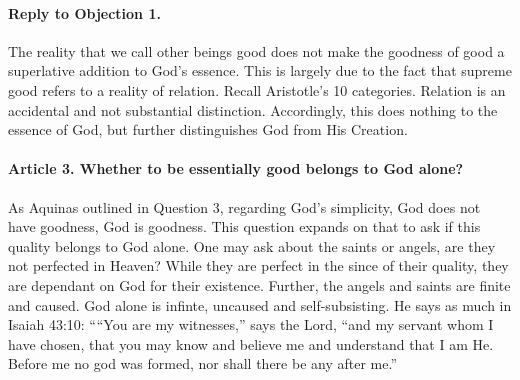 \documentclass{ucetd}
\begin{document}
\paragraph{Reply to Objection 1.}
The reality that we call other beings good does not make the goodness of good a superlative addition to God's essence. This is largely due to the fact that supreme good refers to a reality of relation. Recall Aristotle's 10 categories. Relation is an accidental and not substantial distinction. Accordingly, this does nothing to the essence of God, but further distinguishes God from His Creation.

\paragraph{Article 3. Whether to be essentially good belongs to God alone?}
As Aquinas outlined in Question 3, regarding God's simplicity, God does not have goodness, God is goodness. This question expands on that to ask if this quality belongs to God alone. One may ask about the saints or angels, are they not perfected in Heaven? While they are perfect in the since of their quality, they are dependant on God for their existence. Further, the angels and saints are finite and caused. God alone is infinte, uncaused and self-subsisting. He says as much in Isaiah 43:10: ``“You are my witnesses,” says the Lord,
    “and my servant whom I have chosen,
that you may know and believe me
    and understand that I am He.
Before me no god was formed,
    nor shall there be any after me.''


\end{document}
